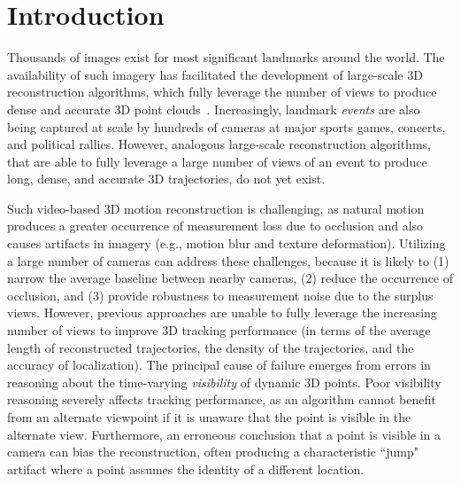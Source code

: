 \documentclass[10pt,twocolumn,letterpaper]{article}
\begin{document}
\section{Introduction}
Thousands of images exist for most significant landmarks around the world. The availability of such imagery has facilitated the development of large-scale 3D reconstruction algorithms, which fully leverage the number of views to produce dense and accurate 3D point clouds~\cite{Snavely:2006,Frahm:2010,Furukawa:2010}. Increasingly, landmark \emph{events} are also being captured at scale by hundreds of cameras at major sports games, concerts, and political rallies. However, analogous large-scale reconstruction algorithms, that are able to fully leverage a large number of views of an event to produce long, dense, and accurate 3D trajectories, do not yet exist. %

Such video-based 3D motion reconstruction is challenging, as natural motion produces a greater occurrence of measurement loss due to occlusion and also causes artifacts in imagery (e.g., motion blur and texture deformation). Utilizing a large number of cameras can address these challenges, because it is likely to (1) narrow the average baseline between nearby cameras, (2) reduce the occurrence of occlusion, and (3) provide robustness to measurement noise due to the surplus views. However, previous approaches are unable to fully leverage the increasing number of views to improve 3D tracking performance (in terms of the average length of reconstructed trajectories, the density of the trajectories, and the accuracy of localization). The principal cause of failure emerges from errors in reasoning about the time-varying \emph{visibility} of dynamic 3D points. Poor visibility reasoning severely affects tracking performance, as an algorithm cannot benefit from an alternate viewpoint if it is unaware that the point is visible in the alternate view. Furthermore, an erroneous conclusion that a point is visible in a camera can bias the reconstruction, often producing a characteristic ``jump" artifact where a point assumes the identity of a different location.

\end{document}
